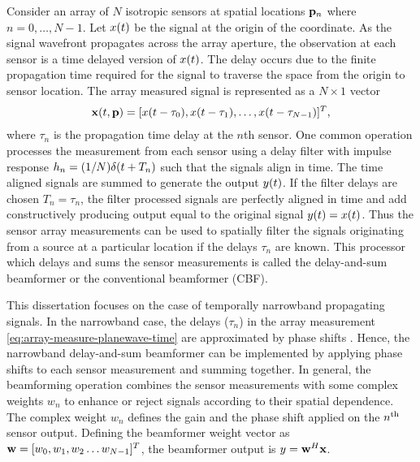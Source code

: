 Consider an array of $N$ isotropic sensors at spatial locations
$\mathbf{p}_n$ where $n = 0,\ldots, N-1$.  Let $x(t)$ be the signal at
the origin of the coordinate. As the signal wavefront propagates
across the array aperture, the observation at each sensor is a time
delayed version of $x(t)$. The delay occurs due to the finite
propagation time required for the signal to traverse the space from
the origin to sensor location. The array measured signal is
represented as a $N \times 1$ vector
\begin{align}
  \label{eq:array-measure-planewave-time}
  \mathbf{x}(t, \mathbf{p}) = [x(t - \tau_0), x(t - \tau_1), \ldots, x(t - \tau_{N-1})]^T,
\end{align}
where $\tau_n$ is the propagation time delay at the $n$th sensor. One
common operation processes the measurement from each sensor using a
delay filter with impulse response $h_n = (1/N)\delta(t + T_n)$
such that the signals align in time. The time aligned signals are
summed to generate the output $y(t)$. If the filter delays are
chosen $T_n = \tau_n$, the filter processed signals are perfectly
aligned in time and add constructively producing output equal to the
original signal $y(t) = x(t)$. Thus the sensor array measurements
can be used to spatially filter the signals originating from a source
at a particular location if the delays $\tau_n$ are known. This
processor which delays and sums the sensor measurements is called the
delay-and-sum beamformer or the conventional beamformer (CBF).


This dissertation focuses on the case of temporally narrowband
propagating signals. In the narrowband case, the delays ($\tau_n$) in the
array measurement \eqref{eq:array-measure-planewave-time} are
approximated by phase shifts \cite[Sec.~2.2]{vtree2002oap}. Hence, the
narrowband delay-and-sum beamformer can be implemented by applying
phase shifts to each sensor measurement and summing together. In general,
the beamforming operation combines the sensor measurements with some
complex weights $w_n$ to enhance or reject signals according to their
spatial dependence. The complex weight $w_n$ defines the gain and the
phase shift applied on the $n^{\rm th}$ sensor output. Defining the
beamformer weight vector as ${\bf w} = [w_0, w_1, w_2\ldots w_{N-1}]^{T}$,
the beamformer output is $ y = {\bf w}^H\mathbf{x}$.

